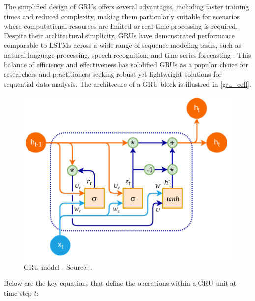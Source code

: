 \documentclass{dsfe}
\begin{document}
The simplified design of GRUs offers several advantages, including faster training times and reduced complexity, making them particularly suitable for scenarios where computational resources are limited or real-time processing is required. Despite their architectural simplicity, GRUs have demonstrated performance comparable to LSTMs across a wide range of sequence modeling tasks, such as natural language processing, speech recognition, and time series forecasting \citep{yang2020}. This balance of efficiency and effectiveness has solidified GRUs as a popular choice for researchers and practitioners seeking robust yet lightweight solutions for sequential data analysis. The architecure of a GRU block is illustred in \autoref{gru_cell}.
\begin{figure}[H]
\begin{center}
\includegraphics[scale=0.8]{GRU.png}
\caption{GRU model - Source: \citep{vasilev2019}.}\label{gru_cell}
\end{center}
\end{figure}
Below are the key equations that define the operations within a GRU unit at time step $t$:
\end{document}
